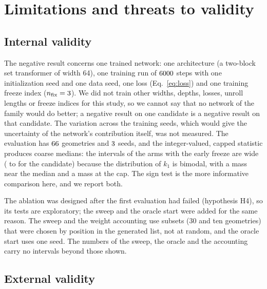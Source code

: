 \section{Limitations and threats to validity}\label{sec:limits}

\subsection{Internal validity}\label{sec:internal}

The negative result concerns one trained network: one architecture (a two-block set transformer of width 64), one training run of $6000$ steps with one initialization seed and one data seed, one loss (Eq.~\eqref{eq:loss}) and one training freeze index ($n_{\mathrm{fix}}=3$). We did not train other widths, depths, losses, unroll lengths or freeze indices for this study, so we cannot say that no network of the family would do better; a negative result on one candidate is a negative result on that candidate.
The variation across the training seeds, which would give the uncertainty of the network's contribution itself, was not measured. The evaluation has $66$ geometries and $3$ seeds, and the integer-valued, capped statistic produces coarse medians: the intervals of the arms with the early freeze are wide (\itNThreeLo{} to \itNThreeHi{} for the candidate) because the distribution of $k_1$ is bimodal, with a mass near the median and a mass at the cap. The sign test is the more informative comparison here, and we report both.

The ablation was designed after the first evaluation had failed (hypothesis H4), so its tests are exploratory; the sweep and the oracle start were added for the same reason. The sweep and the weight accounting use subsets (30 and ten geometries) that were chosen by position in the generated list, not at random, and the oracle start uses one seed. The numbers of the sweep, the oracle and the accounting carry no intervals beyond those shown.

\subsection{External validity}\label{sec:external}

